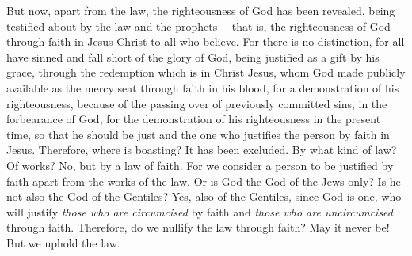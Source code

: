 \begin{biblechapter}
 But now, apart from the law, the righteousness of God has been revealed, being testified about by the law and the prophets—
\verse that is, the righteousness of God through faith in Jesus Christ to all who believe. For there is no distinction,
\verse for all have sinned and fall short of the glory of God,
\verse being justified as a gift by his grace, through the redemption which is in Christ Jesus,
\verse whom God made publicly available as the mercy seat through faith in his blood, for a demonstration of his righteousness, because of the passing over of previously committed sins,
\verse in the forbearance of God, for the demonstration of his righteousness in the present time, so that he should be just and the one who justifies the person by faith in Jesus.
\verse Therefore, where is boasting? It has been excluded. By what kind of law? Of works? No, but by a law of faith.
\verse For we consider a person to be justified by faith apart from the works of the law.
\verse Or is God the God of the Jews only? Is he not also the God of the Gentiles? Yes, also of the Gentiles,
\verse since God is one, who will justify \textit{those who are circumcised} by faith and \textit{those who are uncircumcised} through faith.
\verse Therefore, do we nullify the law through faith? May it never be! But we uphold the law.
\end{biblechapter}

